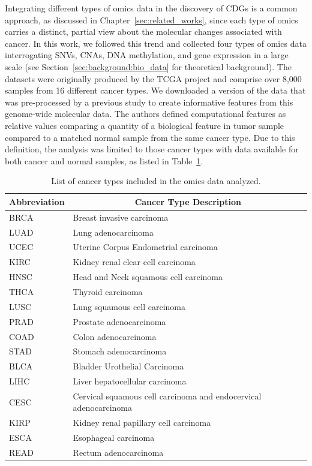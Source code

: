 Integrating different types of omics data in the discovery of CDGs is a common approach, as discussed in Chapter~\ref{sec:related_works}, since each type of omics carries a distinct, partial view about the molecular changes associated with cancer. In this work, we followed this trend and collected four types of omics data interrogating SNVs, CNAs, DNA methylation, and gene expression in a large scale (see Section~\ref{sec:background:bio_data} for theoretical background). The datasets were originally produced by the TCGA project and comprise over 8,000 samples from 16 different cancer types. We downloaded a version of the data that was pre-processed by a previous study \cite{schulte2021integration} to create informative features from this genome-wide molecular data. The authors defined computational features as relative values comparing a quantity of a biological feature in tumor sample compared to a matched normal sample from the same cancer type. Due to this definition, the analysis was limited to those cancer types with data available for both cancer and normal samples, as listed in Table~\ref{tab:cancer_types}.




\begin{table}[!bh]
\centering
\caption{List of cancer types included in the omics data analyzed. \label{tab:cancer_types}}
\begin{tabular}{ll}
\hline
\multicolumn{1}{c}{Abbreviation} & \multicolumn{1}{c}{Cancer Type Description} \\ \hline
BRCA & Breast invasive carcinoma \\
LUAD & Lung adenocarcinoma \\
UCEC & Uterine Corpus Endometrial carcinoma \\
KIRC & Kidney renal clear cell carcinoma \\
HNSC & Head and Neck squamous cell carcinoma \\
THCA & Thyroid carcinoma \\
LUSC & Lung squamous cell carcinoma \\
PRAD & Prostate adenocarcinoma \\
COAD & Colon adenocarcinoma \\
STAD & Stomach adenocarcinoma \\
BLCA & Bladder Urothelial Carcinoma \\
LIHC & Liver hepatocellular carcinoma \\
CESC & Cervical squamous cell carcinoma and endocervical adenocarcinoma \\
KIRP & Kidney renal papillary cell carcinoma \\
ESCA & Esophageal carcinoma \\
READ & Rectum adenocarcinoma \\ \hline
\end{tabular}
\end{table}




